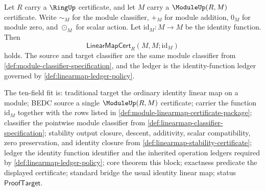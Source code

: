 \begin{theorem}
\label{thm:module-linearmap-identity-certificate}
Let $R$ carry a $\RingUp$ certificate, and let $M$ carry a $\ModuleUp(R,M)$ certificate. Write $\sim_M$ for the module classifier, $+_M$ for module addition, $0_M$ for module zero, and $\odot_M$ for scalar action. Let $\mathrm{id}_M:M\to M$ be the identity function. Then
$$
\mathsf{LinearMapCert}_R(M,M;\mathrm{id}_M)
$$
holds. The source and target classifier are the same module classifier from \autoref{def:module-classifier-specification}, and the ledger is the identity-function ledger governed by \autoref{def:linearmap-ledger-policy}.

The ten-field fit is: traditional target the ordinary identity linear map on a module; BEDC source a single $\ModuleUp(R,M)$ certificate; carrier the function $\mathrm{id}_M$ together with the rows listed in \autoref{def:module-linearmap-certificate-package}; classifier the pointwise module classifier from \autoref{def:linearmap-classifier-specification}; stability output closure, descent, additivity, scalar compatibility, zero preservation, and identity closure from \autoref{def:linearmap-stability-certificate}; ledger the identity function identifier and the inherited operation ledgers required by \autoref{def:linearmap-ledger-policy}; core theorem this block; exactness predicate the displayed certificate; standard bridge the usual identity linear map; status $\mathsf{ProofTarget}$.
\end{theorem}
